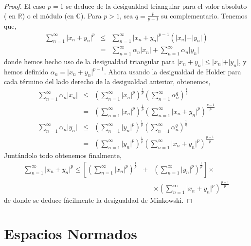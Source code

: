 \documentclass[12pt]{book}
\begin{document}
\begin{proof}
El caso $p=1$  se deduce de  la desigualdad triangular para el valor absoluto ( en $\mathbb{R}$) o 
el m\'odulo (en $\mathbb{C}$). Para $p>1$, sea $q=\frac{p}{p-1}$ su complementario. Tenemos 
que,
\begin{eqnarray*}
\sum_{n=1}^\infty \vert x_n + y_n\vert^p
&\leq&\sum_{n=1}^\infty \vert x_n + y_n\vert^{p-1}(\vert x_n\vert +\vert y_n\vert)\\
&=&\sum_{n=1}^\infty \alpha_n\vert x_n\vert +\sum_{n=1}^\infty \alpha_n\vert y_n\vert
\end{eqnarray*}
donde hemos hecho uso de la desigualdad triangular para $\vert x_n+y_n\vert\leq \vert x_n\vert +
\vert y_n\vert$, y hemos definido $\alpha_n=\vert x_n+y_n\vert^{p-1}$. Ahora usando la 
desigualdad de Holder para cada t\'ermino del lado derecho de la desigualdad anterior, obtenemos,
\begin{eqnarray*}
\sum_{n=1}^\infty \alpha_n\vert x_n\vert &\leq&\left(\sum_{n=1}^\infty \vert x_n\vert^p\right)^\frac{1}
{p}\left(\sum_{n=1}^\infty\alpha_n^q\right)^\frac{1}{q} \\
&=&\left(\sum_{n=1}^\infty \vert x_n\vert^p\right)^\frac{1}{p}\left(\sum_{n=1}^\infty \vert x_n + 
y_n\vert^p\right)^\frac{p-1}{p}\\
\sum_{n=1}^\infty \alpha_n\vert y_n\vert &\leq&\left(\sum_{n=1}^\infty \vert y_n\vert^p\right)^\frac{1}
{p}\left(\sum_{n=1}^\infty\alpha_n^q\right)^\frac{1}{q} \\
&=&\left(\sum_{n=1}^\infty \vert y_n\vert^p\right)^\frac{1}{p}\left(\sum_{n=1}^\infty \vert x_n + 
y_n\vert^p\right)^\frac{p-1}{p}
\end{eqnarray*}
Junt\'andolo todo obtenemos finalmente,
\begin{eqnarray*}
\sum_{n=1}^\infty \vert x_n + y_n\vert^p
\leq\left[\left(\sum_{n=1}^\infty \vert x_n\vert^p\right)^\frac{1}{p}\right.&+&\left.\left(\sum_{n=1}^\infty 
\vert y_n\vert^p\right)^\frac{1}{p}\right]\times\\
&&\times\left(\sum_{n=1}^\infty \vert x_n + y_n\vert^p\right)^\frac{p-1}{p}
\end{eqnarray*}
de donde se deduce f\'acilmente la desigualdad de Minkowski.
\end{proof}




\chapter{Espacios Normados}
\end{document}
